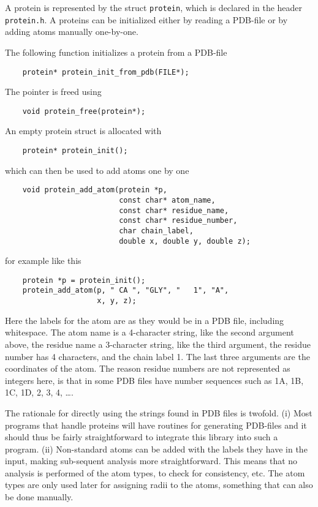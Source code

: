 \documentclass[a4paper,11pt]{article}
\begin{document}
A protein is represented by the struct \texttt{protein}, which is
declared in the header \texttt{protein.h}. A proteins can be
initialized either by reading a PDB-file or by adding atoms manually
one-by-one.

The following function initializes a protein from a PDB-file
\begin{verbatim}
    protein* protein_init_from_pdb(FILE*); 
\end{verbatim}
The pointer is freed using
\begin{verbatim}
    void protein_free(protein*);
\end{verbatim}
An empty protein struct is allocated with 
\begin{verbatim}
    protein* protein_init();
\end{verbatim}
which can then be used to add atoms one by one
\begin{verbatim}
    void protein_add_atom(protein *p, 
                          const char* atom_name,
                          const char* residue_name, 
                          const char* residue_number,
                          char chain_label,
                          double x, double y, double z);

\end{verbatim}
for example like this
\begin{verbatim}
    protein *p = protein_init();
    protein_add_atom(p, " CA ", "GLY", "   1", "A",
                     x, y, z);
\end{verbatim}
Here the labels for the atom are as they would be in a PDB file,
including whitespace. The atom name is a 4-character string, like the
second argument above, the residue name a 3-character string, like the
third argument, the residue number has 4 characters, and the chain
label 1. The last three arguments are the coordinates of the atom. The
reason residue numbers are not represented as integers here, is that
in some PDB files have number sequences such as 1A, 1B, 1C, 1D, 2, 3,
4, \ldots.

The rationale for directly using the strings found in PDB files is
twofold. (i) Most programs that handle proteins will have routines for
generating PDB-files and it should thus be fairly straightforward to
integrate this library into such a program. (ii) Non-standard atoms
can be added with the labels they have in the input, making
sub-sequent analysis more straightforward. This means that no analysis
is performed of the atom types, to check for consistency, etc. The
atom types are only used later for assigning radii to the atoms,
something that can also be done manually.
\end{document}
